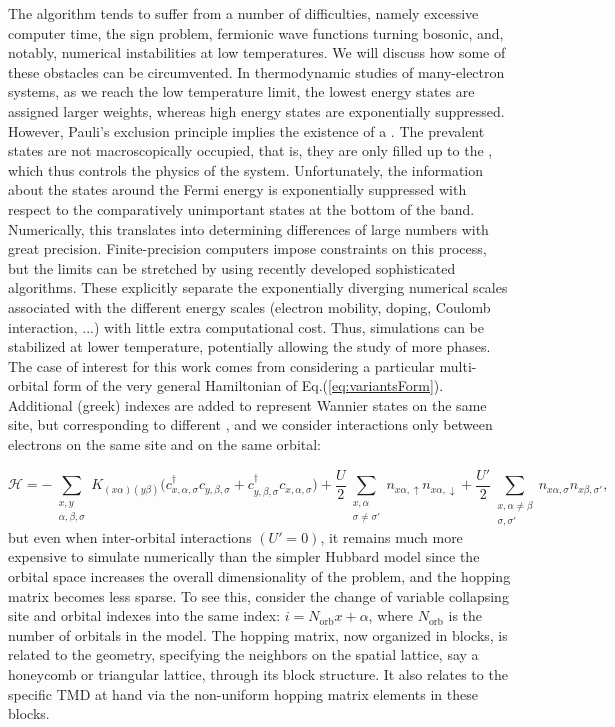 The algorithm tends to suffer from a number of difficulties, namely excessive computer time, the sign problem, fermionic wave functions turning bosonic, and, notably,  numerical instabilities at low temperatures.
We will discuss how some of these obstacles can be circumvented.
In thermodynamic studies of many-electron systems, as we reach the low temperature limit, the lowest energy states are assigned larger weights, whereas high energy states are exponentially suppressed.
However, Pauli's exclusion principle implies the existence of a .
The prevalent states are not macroscopically occupied, that is, they are only filled up to the , which thus controls the physics of the system.
Unfortunately, the information about the states around the Fermi energy is exponentially suppressed with respect to the comparatively unimportant states at the bottom of the band.
Numerically, this translates into determining differences of large numbers with great precision.
Finite-precision computers impose constraints on this process, but the limits can be stretched by using recently developed sophisticated algorithms.
These explicitly separate the exponentially diverging numerical scales associated with the different energy scales (electron mobility, doping, Coulomb interaction, ...) with little extra computational cost.
Thus, simulations can be stabilized at lower temperature, potentially allowing the study of more phases.
The case of interest for this work comes from considering a particular multi-orbital form of the very general Hamiltonian of Eq.(\ref{eq:variantsForm}).
Additional (greek) indexes are added to represent Wannier states on the same site, but corresponding to different , and we consider interactions only between electrons on the same site and on the same orbital:

\begin{equation}\label{eq:variantTMD}
\mathcal{H} = - \sum_{\substack{x, y \\ \alpha, \beta, \sigma}} K_{(x\alpha)(y\beta )} \bigg( c_{x,\alpha, \sigma}^\dagger c_{y,\beta, \sigma} + c_{y,\beta , \sigma}^\dagger c_{x,\alpha, \sigma} \bigg) + \frac{U}{2} \sum_{\substack{x, \alpha \\ \sigma \neq \sigma'} } n_{x\alpha, \uparrow} n_{x\alpha, \downarrow} + \frac{U'}{2} \sum_{\substack{x, \alpha \neq \beta \\ \sigma, \sigma'}} n_{x\alpha, \sigma} n_{x\beta, \sigma'} ,
\end{equation}
but even when inter-orbital interactions $(U' = 0)$, it remains much more expensive to simulate numerically than the simpler Hubbard model since the orbital space increases the overall dimensionality of the problem, and the hopping matrix becomes less sparse.
To see this, consider the change of variable collapsing site and orbital indexes into the same index: $i = N_{\text{orb}} x + \alpha$, where $N_{\text{orb}}$ is the number of orbitals in the model.
The hopping matrix, now organized in blocks, is related to the geometry, specifying the neighbors on the spatial lattice, say a honeycomb or triangular lattice, through its block structure.
It also relates to the specific \acs{TMD} at hand via the non-uniform hopping matrix elements in these blocks.
